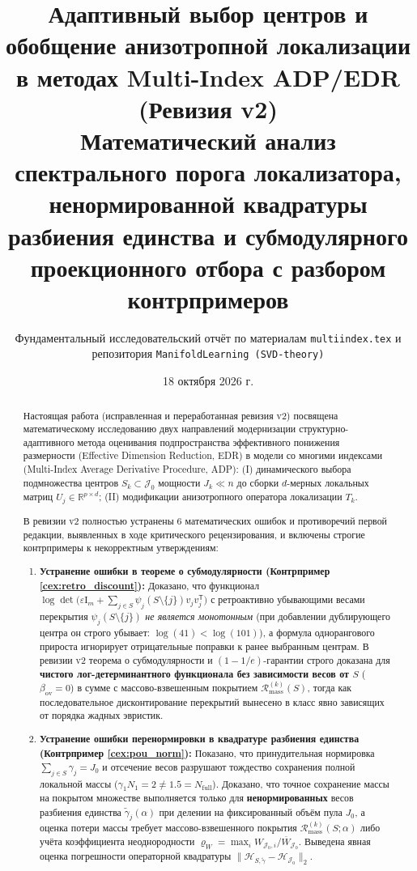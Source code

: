 \documentclass[11pt,a4paper]{article}
\title{\textbf{\color{primary}Адаптивный выбор центров и обобщение анизотропной локализации в методах Multi-Index ADP/EDR (Ревизия v2)}\\[6pt]
\large Математический анализ спектрального порога локализатора, ненормированной квадратуры разбиения единства и субмодулярного проекционного отбора с разбором контрпримеров}
\author{Фундаментальный исследовательский отчёт по материалам \texttt{multiindex.tex} и репозитория \texttt{ManifoldLearning (SVD-theory)}}
\date{18 октября 2026 г.}
\newcommand{\R}{\mathbb{R}}
\newcommand{\Id}{\mathrm{I}}
\newcommand{\T}{^{\mathsf{T}}}
\newcommand{\TEDR}{T}
\newcommand{\JJJ}{\mathcal{J}}
\theoremstyle{definition}
\theoremstyle{remark}
\begin{document}
\maketitle

\begin{abstract}
Настоящая работа (исправленная и переработанная ревизия v2) посвящена математическому исследованию двух направлений модернизации структурно-адаптивного метода оценивания подпространства эффективного понижения размерности (Effective Dimension Reduction, EDR) в модели со многими индексами (Multi-Index Average Derivative Procedure, ADP): (I) динамического выбора подмножества центров $S_k \subset \JJJ_0$ мощности $J_k \ll n$ до сборки $d$-мерных локальных матриц $U_j \in \R^{p \times d}$; (II) модификации анизотропного оператора локализации $\TEDR_k$.

В ревизии v2 полностью устранены 6 математических ошибок и противоречий первой редакции, выявленных в ходе критического рецензирования, и включены строгие контрпримеры к некорректным утверждениям:
\begin{enumerate}
    \item \textbf{Устранение ошибки в теореме о субмодулярности (Контрпример \ref{cex:retro_discount}):} Доказано, что функционал $\log\det\bigl(\varepsilon \Id_m + \sum_{j \in S}\psi_j(S\setminus\{j\})v_j v_j\T\bigr)$ с ретроактивно убывающими весами перекрытия $\psi_j(S\setminus\{j\})$ \emph{не является монотонным} (при добавлении дублирующего центра он строго убывает: $\log(41) < \log(101)$), а формула однорангового прироста игнорирует отрицательные поправки к ранее выбранным центрам. В ревизии v2 теорема о субмодулярности и $(1-1/e)$-гарантии строго доказана для \textbf{чистого лог-детерминантного функционала без зависимости весов от $S$} ($\beta_{\mathrm{ov}}=0$) в сумме с массово-взвешенным покрытием $\mathcal{R}_{\mathrm{mass}}^{(k)}(S)$, тогда как последовательное дисконтирование перекрытий вынесено в класс явно зависящих от порядка жадных эвристик.
    \item \textbf{Устранение ошибки перенормировки в квадратуре разбиения единства (Контрпример \ref{cex:pou_norm}):} Показано, что принудительная нормировка $\sum_{j \in S}\gamma_j = J_0$ и отсечение весов разрушают тождество сохранения полной локальной массы ($\gamma_1 N_1 = 2 \neq 1.5 = N_{\mathrm{full}}$). Доказано, что точное сохранение массы на покрытом множестве выполняется только для \textbf{ненормированных} весов разбиения единства $\tilde{\gamma}_j(\alpha)$ при делении на фиксированный объём пула $J_0$, а оценка потери массы требует массово-взвешенного покрытия $\mathcal{R}_{\mathrm{mass}}^{(k)}(S;\alpha)$ либо учёта коэффициента неоднородности $\varrho_W = \max_i W_{\JJJ_0,i}/\overline{W}_{\JJJ_0}$. Выведена явная оценка погрешности операторной квадратуры $\|\mathcal{H}_{S,\tilde{\gamma}} - \mathcal{H}_{\JJJ_0}\|_2$.

\end{enumerate}
\end{abstract}
\end{document}
